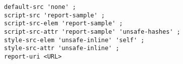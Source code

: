 \begin{verbatim}
default-src 'none' ; 
script-src 'report-sample' ; 
script-src-elem 'report-sample' ; 
script-src-attr 'report-sample' 'unsafe-hashes' ; 
style-src-elem 'unsafe-inline' 'self' ; 
style-src-attr 'unsafe-inline' ; 
report-uri <URL>
\end{verbatim}
